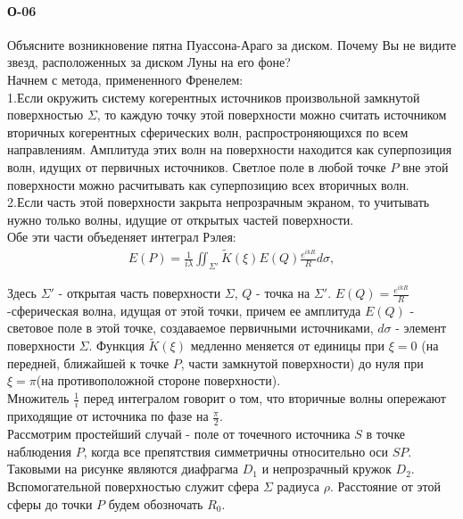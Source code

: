 

\paragraph{О-06}
Объясните возникновение пятна Пуассона-Араго за диском. Почему Вы не видите звезд, расположенных за диском Луны на его фоне?\\

Начнем с метода, примененного Френелем:\\

1.Если окружить систему когерентных источников произвольной замкнутой поверхностью $\Sigma$, то каждую точку этой поверхности можно считать источником вторичных когерентных сферических волн, распростроняющихся по всем направлениям. Амплитуда этих волн на поверхности находится как суперпозиция волн, идущих от первичных источников. Светлое поле в любой точке $P$ вне этой поверхности можно расчитывать как суперпозицию всех вторичных волн.\\

2.Если часть этой поверхности закрыта непрозрачным экраном, то учитывать нужно только волны, идущие от открытых частей поверхности.\\

Обе эти части объеденяет интеграл Рэлея:
\begin{gather}
E(P)= \frac{1}{i\lambda}\iint_{\Sigma'} \tilde{K}(\xi)E(Q)\frac{e^{ikR}}{R}d\sigma ,
\end{gather}

Здесь $\Sigma'$ - открытая часть поверхности $\Sigma$, $Q$ - точка на $\Sigma'$. $E(Q)=\frac{e^{ikR}}{R}$ -сферическая волна, идущая от этой точки, причем ее амплитуда $E(Q)$ - световое поле в этой точке, создаваемое первичными источниками, $d\sigma$ - элемент поверхности $\Sigma$. Функция $\tilde{K}(\xi)$ медленно меняется от единицы при $\xi = 0$ (на передней, ближайшей к точке $P$, части замкнутой поверхности) до нуля при $\xi = \pi$(на противоположной стороне поверхности).\\

Множитель $\frac{1}{i} $ перед интегралом говорит о том, что вторичные волны опережают приходящие от источника по фазе на $\frac{\pi}{2}$.\\

Рассмотрим простейший случай - поле от точечного источника $S$ в точке наблюдения $P$, когда все препятствия симметричны относительно оси $SP$. Таковыми на рисунке являются диафрагма $D_1$ и непрозрачный кружок $D_2$. Вспомогательной поверхностью служит сфера $\Sigma$ радиуса $\rho$. Расстояние от этой сферы до точки $P$ будем обозночать $R_0$.\\

